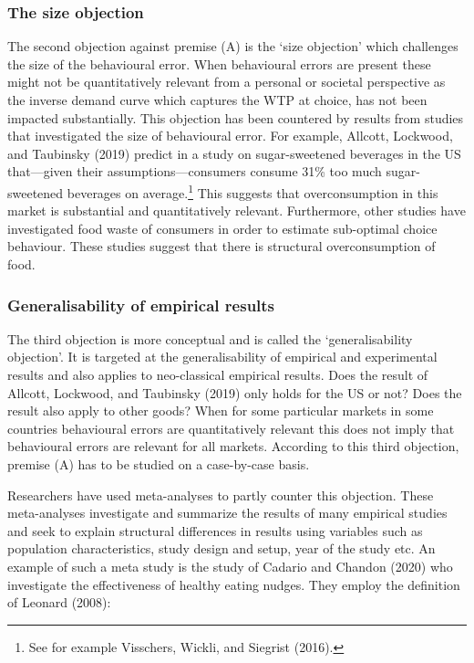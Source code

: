 \documentclass[
]{book}
\begin{document}
\hypertarget{the-size-objection}{%
\subsubsection{The size objection}\label{the-size-objection}}

The second objection against premise (A) is the `size objection' which challenges the size of the behavioural error. When behavioural errors are present these might not be quantitatively relevant from a personal or societal perspective as the inverse demand curve which captures the WTP at choice, has not been impacted substantially. This objection has been countered by results from studies that investigated the size of behavioural error. For example, Allcott, Lockwood, and Taubinsky (2019) predict in a study on sugar-sweetened beverages in the US that---given their assumptions---consumers consume 31\% too much sugar-sweetened beverages on average.\footnote{See for example Visschers, Wickli, and Siegrist (2016).} This suggests that overconsumption in this market is substantial and quantitatively relevant. Furthermore, other studies have investigated food waste of consumers in order to estimate sub-optimal choice behaviour. These studies suggest that there is structural overconsumption of food.

\hypertarget{generalisability-of-empirical-results}{%
\subsubsection{Generalisability of empirical results}\label{generalisability-of-empirical-results}}

The third objection is more conceptual and is called the `generalisability objection'. It is targeted at the generalisability of empirical and experimental results and also applies to neo-classical empirical results. Does the result of Allcott, Lockwood, and Taubinsky (2019) only holds for the US or not? Does the result also apply to other goods? When for some particular markets in some countries behavioural errors are quantitatively relevant this does not imply that behavioural errors are relevant for all markets. According to this third objection, premise (A) has to be studied on a case-by-case basis.

Researchers have used meta-analyses to partly counter this objection. These meta-analyses investigate and summarize the results of many empirical studies and seek to explain structural differences in results using variables such as population characteristics, study design and setup, year of the study etc. An example of such a meta study is the study of Cadario and Chandon (2020) who investigate the effectiveness of healthy eating nudges. They employ the definition of Leonard (2008):
\end{document}
